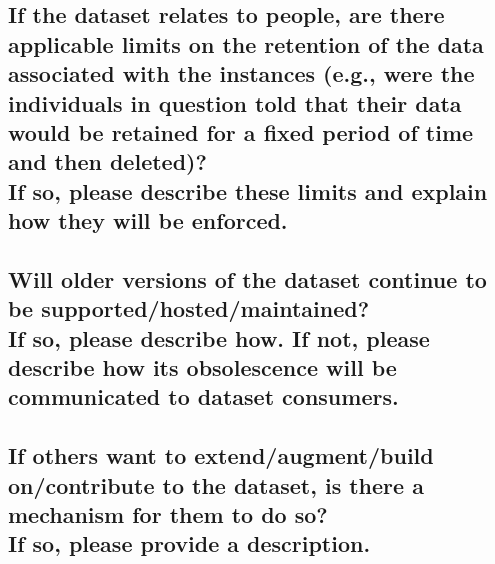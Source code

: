 \documentclass[letterpaper, 10 pt, conference]{ieeeconf}  %
\newcommand{\subtitle}[1]{{\\ \small \normalfont \color{purple} #1}}
\begin{document}
\lipsum[1]

\subsection{If the dataset relates to people, are there applicable limits on the retention of the data associated with the instances (e.g., were the individuals in question told that their data would be retained for a fixed period of time and then deleted)? \subtitle{If so, please describe these limits and explain how they will be enforced.}}

\lipsum[1]

\subsection{Will older versions of the dataset continue to be supported/hosted/maintained? \subtitle{If so, please describe how. If not, please describe how its obsolescence will be communicated to dataset consumers. }}

\lipsum[1]

\subsection{If others want to extend/augment/build on/contribute to the dataset, is there a mechanism for them to do so? \subtitle{If so, please provide a description.}}

\lipsum[1]

\medskip
 
  

\end{document}
